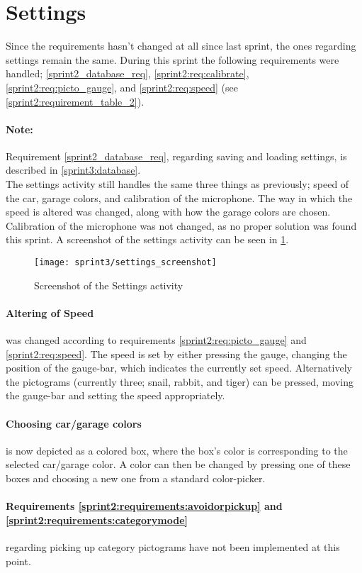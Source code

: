 \section{Settings}

Since the requirements hasn't changed at all since last sprint, the ones regarding settings remain the same.
During this sprint the following requirements were handled; \ref{sprint2_database_req}, \ref{sprint2:req:calibrate}, \ref{sprint2:req:picto_gauge}, and \ref{sprint2:req:speed} (see \cref{sprint2:requirement_table_2}).

\paragraph{Note:} Requirement \ref{sprint2_database_req}, regarding saving and loading settings, is described in \ref{sprint3:database}.\\

\noindent
The settings activity still handles the same three things as previously; speed of the car, garage colors, and calibration of the microphone.
The way in which the speed is altered was changed, along with how the garage colors are chosen.
Calibration of the microphone was not changed, as no proper solution was found this sprint.
A screenshot of the settings activity can be seen in \cref{sprint3:settings:screenshot}.

\begin{figure}
\texttt{[image: sprint3/settings\_screenshot]}
\caption{Screenshot of the Settings activity}
\label{sprint3:settings:screenshot}
\end{figure}

\paragraph{Altering of Speed} was changed according to requirements \ref{sprint2:req:picto_gauge} and \ref{sprint2:req:speed}.
The speed is set by either pressing the gauge, changing the position of the gauge-bar, which indicates the currently set speed.
Alternatively the pictograms (currently three; snail, rabbit, and tiger) can be pressed, moving the gauge-bar and setting the speed appropriately.

\paragraph{Choosing car/garage colors} is now depicted as a colored box, where the box's color is corresponding to the selected car/garage color.
A color can then be changed by pressing one of these boxes and choosing a new one from a standard color-picker.

\paragraph{Requirements \ref{sprint2:requirements:avoidorpickup} and \ref{sprint2:requirements:categorymode}} regarding picking up category pictograms have not been implemented at this point.